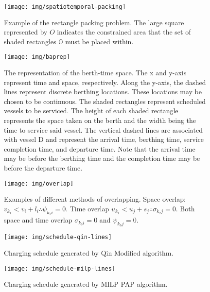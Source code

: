 \documentclass[utf8]{FrontiersinHarvard}
\begin{document}
\begin{figure}[htpb]
\centering
    \texttt{[image: img/spatiotemporal-packing]}
    \caption{Example of the rectangle packing problem. The large square represented by $O$ indicates the constrained
      area that the set of shaded rectangles $\mathbb{O}$ must be placed within.}
    \label{fig:packexample}
\end{figure}

\begin{figure}[ht]
\centering
    \texttt{[image: img/baprep]}
    \caption{The representation of the berth-time space. The x and y-axis represent time and space, respectively. Along
      the y-axis, the dashed lines represent discrete berthing locations. These locations may be chosen to be
      continuous. The shaded rectangles represent scheduled vessels to be serviced. The height of each shaded rectangle
      represents the space taken on the berth and the width being the time to service said vessel. The vertical dashed
      lines are associated with vessel D and represent the arrival time, berthing time, service completion time, and
      departure time. Note that the arrival time may be before the berthing time and the completion time may be before
      the departure time.}
    \label{fig:bap}
\end{figure}

\begin{figure}[htpb]
\centering
    \texttt{[image: img/overlap]}
    \caption{Examples of different methods of overlapping. Space overlap: $v_{k_1} < v_{i} + l_i \therefore \psi_{k_{1}i} = 0$.
             Time overlap $u_{k_1} < u_{j} + s_j \therefore \sigma_{k_{2}j} = 0$. Both space and time overlap $\sigma_{k_{3}i} = 0$ and
             $\psi_{k_{3}j} = 0$.}
    \label{fig:multipleassign}
\end{figure}

\begin{subfigures}
    \begin{figure}[htpb]
    \centering
    \texttt{[image: img/schedule-qin-lines]}
        \caption{Charging schedule generated by Qin Modified algorithm.}
        \label{subfig:qin-schedule}
    \end{figure}

    \hfill

    \begin{figure}[htpb]
    \centering
        \texttt{[image: img/schedule-milp-lines]}
        \caption{Charging schedule generated by MILP PAP algorithm.}
        \label{subfig:milp-schedule}
    \end{figure}
\end{subfigures}
\end{document}
